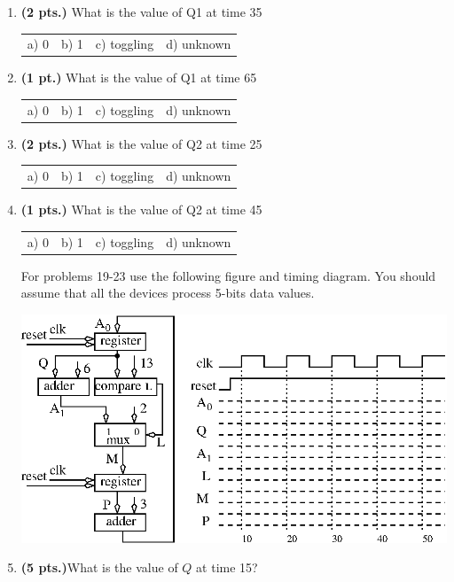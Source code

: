 \documentclass{article}
\begin{document}
\begin{enumerate}
\item {\bf (2 pts.)} What is the value of Q1 at time 35

\begin{tabular}{p{0.75in}p{0.75in}p{0.75in}p{1.25in}}
a) 0 & b) 1 & c) toggling & d) unknown \\
\end{tabular}

\item {\bf (1 pt.)} What is the value of Q1 at time 65

\begin{tabular}{p{0.75in}p{0.75in}p{0.75in}p{1.25in}}
a) 0 & b) 1 & c) toggling & d) unknown \\
\end{tabular}

\item {\bf (2 pts.)} What is the value of Q2 at time 25

\begin{tabular}{p{0.75in}p{0.75in}p{0.75in}p{1.25in}}
a) 0 & b) 1 & c) toggling & d) unknown \\
\end{tabular}

\item {\bf (1 pts.)} What is the value of Q2 at time 45

\begin{tabular}{p{0.75in}p{0.75in}p{0.75in}p{1.25in}}
a) 0 & b) 1 & c) toggling & d) unknown \\
\end{tabular}

\pagebreak
For problems 19-23 use the following figure and timing diagram.
You should assume that all the devices process 5-bits data
values.

\includegraphics{./Fig2/BBBtiming4}

\item {\bf (5 pts.)}What is the value of $Q$ at time 15?


\end{enumerate}
\end{document}
